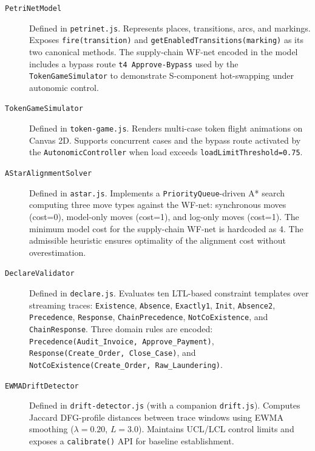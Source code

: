 \begin{description}
  \item[\texttt{PetriNetModel}] Defined in \texttt{petrinet.js}. Represents places, transitions,
        arcs, and markings. Exposes \texttt{fire(transition)} and
        \texttt{getEnabledTransitions(marking)} as its two canonical methods. The supply-chain
        WF-net encoded in the model includes a bypass route \texttt{t4 Approve-Bypass} used
        by the \texttt{TokenGameSimulator} to demonstrate S-component hot-swapping under autonomic
        control.

  \item[\texttt{TokenGameSimulator}] Defined in \texttt{token-game.js}. Renders multi-case token
        flight animations on Canvas 2D. Supports concurrent cases and the bypass route activated
        by the \texttt{AutonomicController} when load exceeds \texttt{loadLimitThreshold=0.75}.

  \item[\texttt{AStarAlignmentSolver}] Defined in \texttt{astar.js}. Implements a
        \texttt{PriorityQueue}-driven A* search computing three move types against the WF-net:
        synchronous moves (cost=0), model-only moves (cost=1), and log-only moves (cost=1).
        The minimum model cost for the supply-chain WF-net is hardcoded as 4. The admissible
        heuristic ensures optimality of the alignment cost without overestimation.

  \item[\texttt{DeclareValidator}] Defined in \texttt{declare.js}. Evaluates ten LTL-based
        constraint templates over streaming traces: \texttt{Existence}, \texttt{Absence},
        \texttt{Exactly1}, \texttt{Init}, \texttt{Absence2}, \texttt{Precedence},
        \texttt{Response}, \texttt{ChainPrecedence}, \texttt{NotCoExistence}, and
        \texttt{ChainResponse}. Three domain rules are encoded:
        \texttt{Precedence(Audit\_Invoice, Approve\_Payment)},
        \texttt{Response(Create\_Order, Close\_Case)}, and
        \texttt{NotCoExistence(Create\_Order, Raw\_Laundering)}.

  \item[\texttt{EWMADriftDetector}] Defined in \texttt{drift-detector.js} (with a companion
        \texttt{drift.js}). Computes Jaccard DFG-profile distances between trace windows using
        EWMA smoothing ($\lambda=0.20$, $L=3.0$). Maintains UCL/LCL control limits and exposes
        a \texttt{calibrate()} API for baseline establishment.


\end{description}
